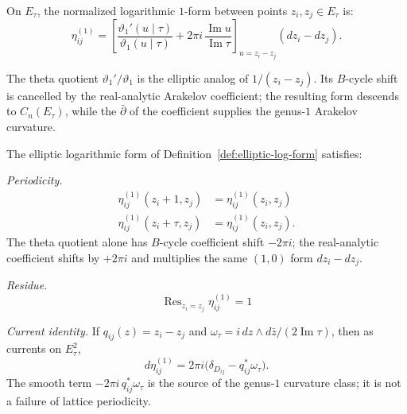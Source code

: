 \begin{definition}
\label{def:elliptic-log-form}
On $E_\tau$, the normalized logarithmic $1$-form between points
$z_i,z_j\in E_\tau$ is:
\begin{equation}
\eta_{ij}^{(1)}
=
\left[
\frac{\vartheta_1'(u\mid\tau)}{\vartheta_1(u\mid\tau)}
+2\pi i\,\frac{\operatorname{Im}u}{\operatorname{Im}\tau}
\right]_{u=z_i-z_j}
(dz_i-dz_j).
\end{equation}

The theta quotient $\vartheta_1'/\vartheta_1$ is the elliptic analog
of $1/(z_i-z_j)$. Its $B$-cycle shift is cancelled by the
real-analytic Arakelov coefficient; the resulting form descends to
$C_n(E_\tau)$, while the $\bar\partial$ of the coefficient supplies
the genus-$1$ Arakelov curvature.
\end{definition}

\begin{theorem}
\label{thm:eta-properties-genus1}
The elliptic logarithmic form of
Definition~\ref{def:elliptic-log-form} satisfies:

\emph{Periodicity.}
\begin{align}
\eta_{ij}^{(1)}(z_i + 1, z_j) &= \eta_{ij}^{(1)}(z_i, z_j) \\
\eta_{ij}^{(1)}(z_i + \tau, z_j) &= \eta_{ij}^{(1)}(z_i, z_j).
\end{align}
The theta quotient alone has $B$-cycle coefficient shift $-2\pi i$;
the real-analytic coefficient shifts by $+2\pi i$ and multiplies the
same $(1,0)$ form $dz_i-dz_j$.

\emph{Residue.}
\begin{equation}
\operatorname{Res}_{z_i = z_j} \eta_{ij}^{(1)} = 1
\end{equation}

\emph{Current identity.} If $q_{ij}(z)=z_i-z_j$ and
$\omega_\tau=i\,dz\wedge d\bar z/(2\operatorname{Im}\tau)$, then as
currents on $E_\tau^2$,
\begin{equation}
d\eta_{ij}^{(1)}
=
2\pi i\bigl(\delta_{D_{ij}}-q_{ij}^{*}\omega_\tau\bigr).
\end{equation}
The smooth term $-2\pi i\,q_{ij}^{*}\omega_\tau$ is the source of the
genus-$1$ curvature class; it is not a failure of lattice
periodicity.
\end{theorem}

